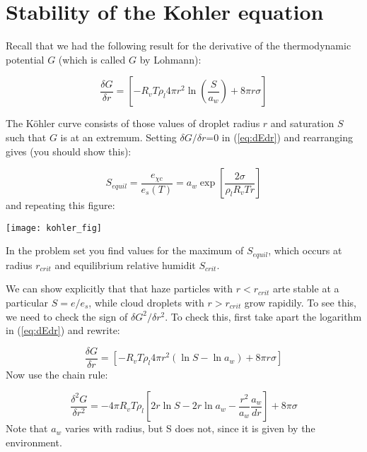 \documentclass[12pt]{article}
\begin{document}
\pagestyle{first}

\section{Stability of the Kohler equation}

Recall that we had the following result for the derivative of the thermodynamic potential $G$ (which is called
$G$ by Lohmann):


\begin{equation}
  \label{eq:dEdr}
  \frac{\delta G}{\delta r} = \left [ -R_v T \rho_l 4 \pi r^2 \ln \left ( \frac{S}{a_w}
    \right ) + 8 \pi r \sigma \right ]
\end{equation}

\noindent
The K\"ohler curve consists of those values of droplet radius $r$ and
saturation $S$ such that $G$ is at an extremum.  Setting $\delta G/\delta r$=0 in (\ref{eq:dEdr})
and rearranging gives (you should show this):

\begin{equation}
  \label{eq:kohler}
  S_{equil} = \frac{e_{\chi c}}{e_s(T)} =  a_w \exp \left [ \frac{2\sigma}{\rho_l R_v T r} \right ]
\end{equation}
and repeating this figure:


\texttt{[image: kohler\_fig]}


In the problem set you find values for the maximum of $S_{equil}$, which occurs
at radius $r_{crit}$ and equilibrium relative humidit $S_{crit}$.


We can show explicitly that 
that haze particles with $r < r_{crit}$ arte stable
at a particular $S=e/e_s$, while cloud droplets with $r > r_{crit}$ grow
rapidily. To see this, we need to check
the sign of $\delta G^2/\delta r^2$.  To check this, first take apart the logarithm
in (\ref{eq:dEdr}) and rewrite:

\begin{equation}
  \frac{\delta G}{\delta r} = \left [ -R_v T \rho_l 4 \pi r^2 \left ( \ln S - \ln a_w
    \right ) + 8 \pi r \sigma \right ] 
  \label{eq:nouse}
\end{equation}
Now use the chain rule:

\begin{equation}
  \frac{\delta ^2G}{\delta r^2} = - 4 \pi R_v T \rho_l \left [   2 r \ln S - 2 r\ln a_w
    -\frac{r^2}{a_w} \frac{a_w}{dr} \right ]  + 8 \pi \sigma
\label{eq:expand}
\end{equation}
Note that  $a_w$ varies with radius, but S does
not, since it is given by the environment.
\end{document}
